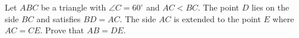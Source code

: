 Let $ABC$ be a triangle with $\angle C=60^\circ$ and $AC<BC$. The point $D$ lies on the side $BC$ and satisfies $BD=AC$. The side $AC$ is extended to the point $E$ where $AC=CE$. Prove that $AB=DE$.